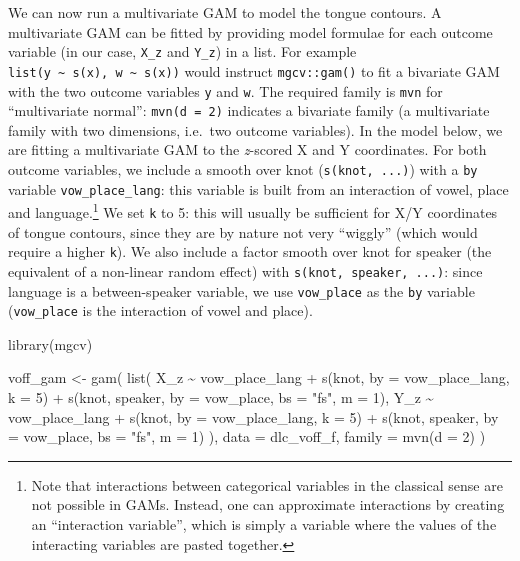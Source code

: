 \documentclass[
]{interact}
\newenvironment{Shaded}{\begin{snugshade}}{\end{snugshade}}
\newcommand{\AttributeTok}[1]{\textcolor[rgb]{0.40,0.45,0.13}{#1}}
\newcommand{\DecValTok}[1]{\textcolor[rgb]{0.68,0.00,0.00}{#1}}
\newcommand{\FunctionTok}[1]{\textcolor[rgb]{0.28,0.35,0.67}{#1}}
\newcommand{\NormalTok}[1]{\textcolor[rgb]{0.00,0.23,0.31}{#1}}
\newcommand{\OtherTok}[1]{\textcolor[rgb]{0.00,0.23,0.31}{#1}}
\newcommand{\SpecialCharTok}[1]{\textcolor[rgb]{0.37,0.37,0.37}{#1}}
\newcommand{\StringTok}[1]{\textcolor[rgb]{0.13,0.47,0.30}{#1}}
\begin{document}
We can now run a multivariate GAM to model the tongue contours. A
multivariate GAM can be fitted by providing model formulae for each
outcome variable (in our case, \texttt{X\_z} and \texttt{Y\_z}) in a
list. For example
\texttt{list(y\ \textasciitilde{}\ s(x),\ w\ \textasciitilde{}\ s(x))}
would instruct \texttt{mgcv::gam()} to fit a bivariate GAM with the two
outcome variables \texttt{y} and \texttt{w}. The required family is
\texttt{mvn} for ``multivariate normal'': \texttt{mvn(d\ =\ 2)}
indicates a bivariate family (a multivariate family with two dimensions,
i.e.~two outcome variables). In the model below, we are fitting a
multivariate GAM to the \emph{z}-scored X and Y coordinates. For both
outcome variables, we include a smooth over knot
(\texttt{s(knot,\ ...)}) with a \texttt{by} variable
\texttt{vow\_place\_lang}: this variable is built from an interaction of
vowel, place and language.\footnote{Note that interactions between
  categorical variables in the classical sense are not possible in GAMs.
  Instead, one can approximate interactions by creating an ``interaction
  variable'', which is simply a variable where the values of the
  interacting variables are pasted together.} We set \texttt{k} to 5:
this will usually be sufficient for X/Y coordinates of tongue contours,
since they are by nature not very ``wiggly'' (which would require a
higher \texttt{k}). We also include a factor smooth over knot for
speaker (the equivalent of a non-linear random effect) with
\texttt{s(knot,\ speaker,\ ...)}: since language is a between-speaker
variable, we use \texttt{vow\_place} as the \texttt{by} variable
(\texttt{vow\_place} is the interaction of vowel and place).

\begin{Shaded}
\begin{Highlighting}[]
\FunctionTok{library}\NormalTok{(mgcv)}

\NormalTok{voff\_gam }\OtherTok{\textless{}{-}} \FunctionTok{gam}\NormalTok{(}
  \FunctionTok{list}\NormalTok{(}
\NormalTok{    X\_z }\SpecialCharTok{\textasciitilde{}}\NormalTok{ vow\_place\_lang }\SpecialCharTok{+}
      \FunctionTok{s}\NormalTok{(knot, }\AttributeTok{by =}\NormalTok{ vow\_place\_lang, }\AttributeTok{k =} \DecValTok{5}\NormalTok{) }\SpecialCharTok{+}
      \FunctionTok{s}\NormalTok{(knot, speaker, }\AttributeTok{by =}\NormalTok{ vow\_place, }\AttributeTok{bs =} \StringTok{"fs"}\NormalTok{, }\AttributeTok{m =} \DecValTok{1}\NormalTok{),}
\NormalTok{    Y\_z }\SpecialCharTok{\textasciitilde{}}\NormalTok{ vow\_place\_lang }\SpecialCharTok{+}
      \FunctionTok{s}\NormalTok{(knot, }\AttributeTok{by =}\NormalTok{ vow\_place\_lang, }\AttributeTok{k =} \DecValTok{5}\NormalTok{) }\SpecialCharTok{+}
      \FunctionTok{s}\NormalTok{(knot, speaker, }\AttributeTok{by =}\NormalTok{ vow\_place, }\AttributeTok{bs =} \StringTok{"fs"}\NormalTok{, }\AttributeTok{m =} \DecValTok{1}\NormalTok{)}
\NormalTok{  ),}
  \AttributeTok{data =}\NormalTok{ dlc\_voff\_f,}
  \AttributeTok{family =} \FunctionTok{mvn}\NormalTok{(}\AttributeTok{d =} \DecValTok{2}\NormalTok{)}
\NormalTok{)}
\end{Highlighting}
\end{Shaded}
\end{document}
